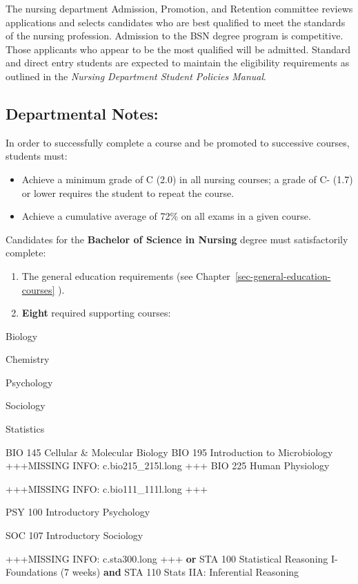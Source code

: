 \documentclass[
  letterpaper,
]{scrbook}
\providecommand{\tightlist}{%
  \setlength{\itemsep}{0pt}\setlength{\parskip}{0pt}}
\begin{document}
The nursing department Admission, Promotion, and Retention committee
reviews applications and selects candidates who are best qualified to
meet the standards of the nursing profession. Admission to the BSN
degree program is competitive. Those applicants who appear to be the
most qualified will be admitted. Standard and direct entry students are
expected to maintain the eligibility requirements as outlined in the
\emph{Nursing Department Student Policies Manual}.

\subsection{Departmental Notes:}\label{departmental-notes-1}

In order to successfully complete a course and be promoted to successive
courses, students must:

\begin{itemize}
\tightlist
\item
  Achieve a minimum grade of C (2.0) in all nursing courses; a grade of
  C- (1.7) or lower requires the student to repeat the course.
\item
  Achieve a cumulative average of 72\% on all exams in a given course.
\end{itemize}

Candidates for the \textbf{Bachelor of Science in Nursing} degree must
satisfactorily complete:

\begin{enumerate}
\def\labelenumi{\arabic{enumi}.}
\item
  The general education requirements (see
  Chapter~\ref{sec-general-education-courses} ).
\item
  \textbf{Eight} required supporting courses:
\end{enumerate}

Biology

Chemistry

Psychology

Sociology

Statistics

BIO 145 Cellular \& Molecular Biology BIO 195 Introduction to
Microbiology +++MISSING INFO: c.bio215\_215l.long +++ BIO 225 Human
Physiology

+++MISSING INFO: c.bio111\_111l.long +++

PSY 100 Introductory Psychology

SOC 107 Introductory Sociology

+++MISSING INFO: c.sta300.long +++ \textbf{or} STA 100 Statistical
Reasoning I-Foundations (7 weeks) \textbf{and} STA 110 Stats IIA:
Inferential Reasoning
\end{document}
